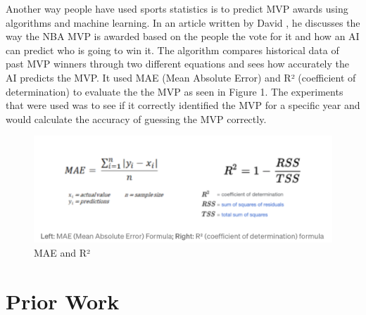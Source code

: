 \documentclass[10pt,twocolumn]{article}
\begin{document}
Another way people have used sports statistics is to predict MVP awards using algorithms and machine learning. In an article written by David \textcite{MVPpredict}, he discusses the way the NBA MVP is awarded based on the people the vote for it and how an AI can predict who is going to win it. The algorithm compares historical data of past MVP winners through two different equations and sees how accurately the AI predicts the MVP. It used MAE (Mean Absolute Error) and R² (coefficient of determination) to evaluate the the MVP as seen in Figure 1. The experiments that were used was to see if it correctly identified the MVP for a specific year and would calculate the accuracy of guessing the MVP correctly. 

\begin{figure}
    \centering
    \includegraphics[width=.95\linewidth]{stats.png}
    \caption{
        MAE and R²
    }
    \label{fig:second-page-1}
\end{figure}


\section{Prior Work}
\end{document}
